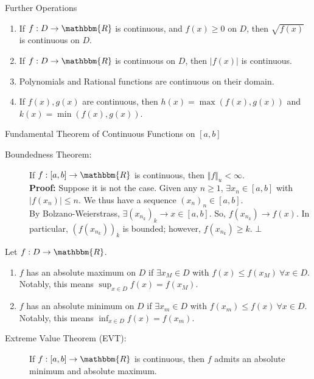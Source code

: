 \documentclass[10pt]{extarticle}
\newcommand{\R}{\mathbbm{R}}
\begin{document}
  \begin{problem}{Further Operations}
    \begin{enumerate}[(1)]
      \item If $f: D\rightarrow \R$ is continuous, and $f(x) \geq 0$ on $D$, then $\sqrt{f(x)}$ is continuous on $D$.
      \item If $f: D\rightarrow \R$ is continuous on $D$, then $|f(x)|$ is continuous.
      \item Polynomials and Rational functions are continuous on their domain.
      \item If $f(x),g(x)$ are continuous, then $h(x) = \max(f(x),g(x))$ and $k(x) = \min(f(x),g(x))$.
    \end{enumerate}
  \end{problem}
  \begin{problem}{Fundamental Theorem of Continuous Functions on $[a,b]$}
    \begin{description}
      \item[Boundedness Theorem:] If $f: [a,b] \rightarrow \R$ is continuous, then $\Vert f \Vert_{u} < \infty$.\\

        \textbf{Proof:} Suppose it is not the case. Given any $n\geq 1$, $\exists x_n\in [a,b]$ with $|f(x_n)|\leq n$. We thus have a sequence $(x_n)_n\in [a,b]$.\\

        By Bolzano-Weierstrass, $\exists (x_{n_k})_k \rightarrow x\in [a,b]$. So, $f(x_{n_k})\rightarrow f(x)$. In particular, $(f(x_{n_k}))_k$ is bounded; however, $f(x_{n_k})\geq k$. $\bot$
    \end{description}
    Let $f: D\rightarrow \R$.
    \begin{enumerate}[(1)]
      \item $f$ has an absolute maximum on $D$ if $\exists x_M\in D$ with $f(x) \leq f(x_M)~\forall x\in D$. Notably, this means $\sup_{x\in D}f(x) = f(x_M)$.
      \item $f$ has an absolute minimum on $D$ if $\exists x_m\in D$ with $f(x_m)\leq f(x)~\forall x\in D$. Notably, this means $\inf_{x\in D} f(x) = f(x_m)$.
    \end{enumerate}
    \begin{description}
      \item[Extreme Value Theorem (EVT):] If $f: [a,b] \rightarrow \R$ is continuous, then $f$ admits an absolute minimum and absolute maximum.\\


\end{description}
\end{problem}
\end{document}
